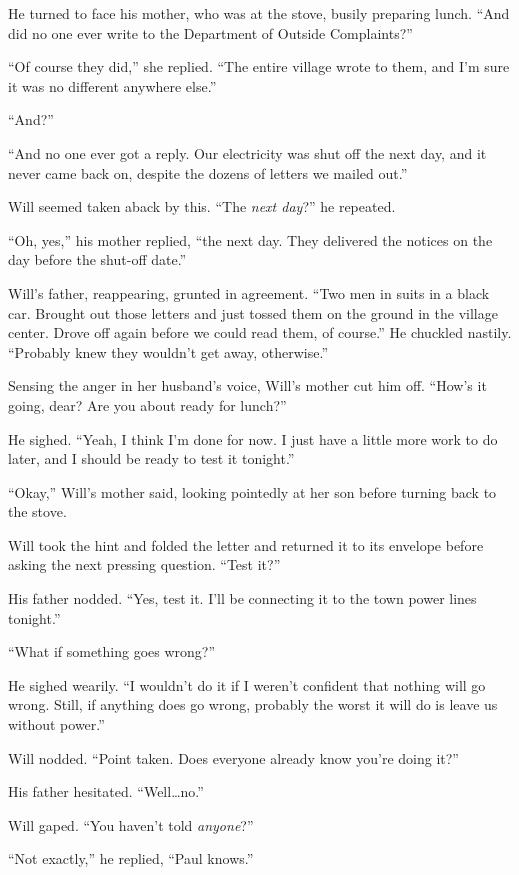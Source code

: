 \documentclass[12pt,letterpaper,oneside,english]{book}
\begin{document}
He turned to face his mother, who was at the stove, busily preparing
lunch. ``And did no one ever write to the Department of Outside
Complaints?''

``Of course they did,'' she replied. ``The entire village wrote to them,
and I'm sure it was no different anywhere else.''

``And?''

``And no one ever got a reply. Our electricity was shut off the next
day, and it never came back on, despite the dozens of letters we mailed
out.''

Will seemed taken aback by this. ``The \emph{next day}?'' he repeated.

``Oh, yes,'' his mother replied, ``the next day. They delivered the
notices on the day before the shut-off date.''

Will's father, reappearing, grunted in agreement.  ``Two men in suits in
a black car. Brought out those letters and just tossed them on the
ground in the village center. Drove off again before we could read them,
of course.'' He chuckled nastily. ``Probably knew they wouldn't get
away, otherwise.''

Sensing the anger in her husband's voice, Will's mother cut him off.
``How's it going, dear? Are you about ready for lunch?''

He sighed. ``Yeah, I think I'm done for now. I just have a little more
work to do later, and I should be ready to test it tonight.''

``Okay,'' Will's mother said, looking pointedly at her son before
turning back to the stove.

Will took the hint and folded the letter and returned it to its
envelope before asking the next pressing question. ``Test it?''

His father nodded. ``Yes, test it. I'll be connecting it to the town
power lines tonight.''

``What if something goes wrong?''

He sighed wearily. ``I wouldn't do it if I weren't confident that
nothing will go wrong. Still, if anything does go wrong, probably the
worst it will do is leave us without power.''

Will nodded. ``Point taken. Does everyone already know you're doing it?''

His father hesitated. ``Well\ldots{}no.''

Will gaped. ``You haven't told \emph{anyone}?''

``Not exactly,'' he replied, ``Paul knows.''
\end{document}
